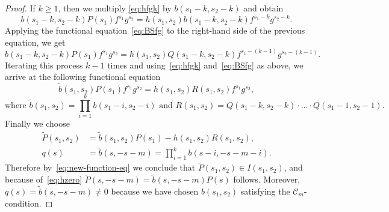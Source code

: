 \documentclass[10pt,a4paper]{amsart}
\begin{document}
\begin{proof}

If $k\geq 1$, then we multiply \eqref{eq:hfgk} by $b(s_1-k,s_2-k)$ and obtain
\[
b(s_1-k,s_2-k) P(s_1) f^{s_1} g^{s_2} = h(s_1,s_2) b(s_1-k,s_2-k) f^{s_1-k} g^{s_2-k}.
\]
Applying the functional equation~\eqref{eq:BSfg} to the right-hand side of the previous equation, we get
\[
b(s_1-k,s_2-k) P(s_1) f^{s_1} g^{s_2} = h(s_1,s_2) Q(s_1-k,s_2-k) f^{s_1-(k-1)} g^{s_2-(k-1)}.
\]
Iterating this process $k-1$ times and using~\eqref{eq:hfgk} and~\eqref{eq:BSfg} as above, we arrive at the following functional equation
\begin{equation}\label{eq:new-function-eq}
\tilde{b}(s_1,s_2) P(s_1) f^{s_1} g^{s_2} = h(s_1,s_2) R(s_1,s_2) f^{s_1} g^{s_2},
\end{equation}
\[
\mbox{where }
\tilde{b}(s_1,s_2) = \prod_{i=1}^k b(s_1-i, s_2-i) \mbox{ and } R(s_1,s_2) = Q(s_1-k,s_2-k) \cdot \ldots \cdot Q(s_1-1,s_2-1).
\]
Finally we choose
\[
\begin{aligned}
\tilde{P}(s_1,s_2) &= \tilde{b}(s_1,s_2) P(s_1) - h(s_1,s_2) R(s_1,s_2), \\
q(s) &= \tilde{b}(s,-s-m) = \prod_{i=1}^k b(s-i, -s-m-i).
\end{aligned}
\]
Therefore by~\eqref{eq:new-function-eq} we conclude that $\tilde{P}(s_1,s_2) \in I(s_1,s_2)$,
and because of~\eqref{eq:hzero} $\tilde{P}(s,-s-m) = \tilde{b}(s,-s-m) P(s)$ follows.
Moreover, $q(s) = \tilde{b}(s,-s-m) \neq 0$ because we have chosen $b(s_1,s_2)$ satisfying the $\mathcal{C}_m$-condition.
\end{proof}
\end{document}
